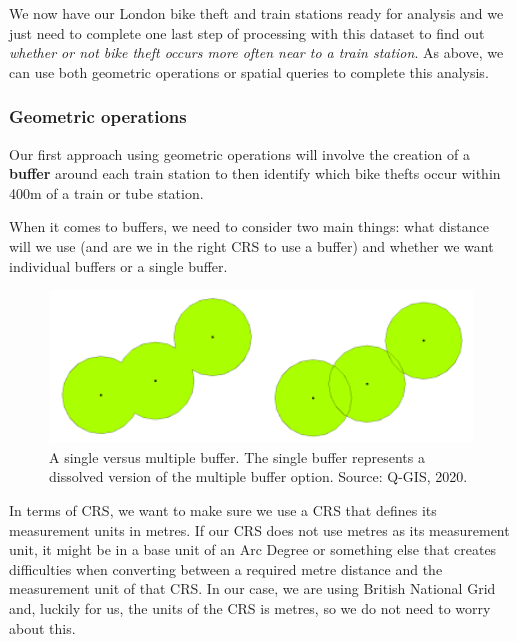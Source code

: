 \documentclass[
]{book}
\begin{document}
We now have our London bike theft and train stations ready for analysis and we just need to complete one last step of processing with this dataset to find out \emph{whether or not bike theft occurs more often near to a train station}. As above, we can use both geometric operations or spatial queries to complete this analysis.

\hypertarget{geometric-operations-1}{%
\subsubsection{Geometric operations}\label{geometric-operations-1}}

Our first approach using geometric operations will involve the creation of a \textbf{buffer} around each train station to then identify which bike thefts occur within 400m of a train or tube station.

When it comes to buffers, we need to consider two main things: what distance will we use (and are we in the right CRS to use a buffer) and whether we want individual buffers or a single buffer.

\begin{figure}

{\centering \includegraphics[width=500pt]{images/w06/buffer} 

}

\caption{A single versus multiple buffer. The single buffer represents a dissolved version of the multiple buffer option. Source: Q-GIS, 2020.}\label{fig:06-buffer-buffer}
\end{figure}

In terms of CRS, we want to make sure we use a CRS that defines its measurement units in metres. If our CRS does not use metres as its measurement unit, it might be in a base unit of an Arc Degree or something else that creates difficulties when converting between a required metre distance and the measurement unit of that CRS. In our case, we are using British National Grid and, luckily for us, the units of the CRS is metres, so we do not need to worry about this.
\end{document}
